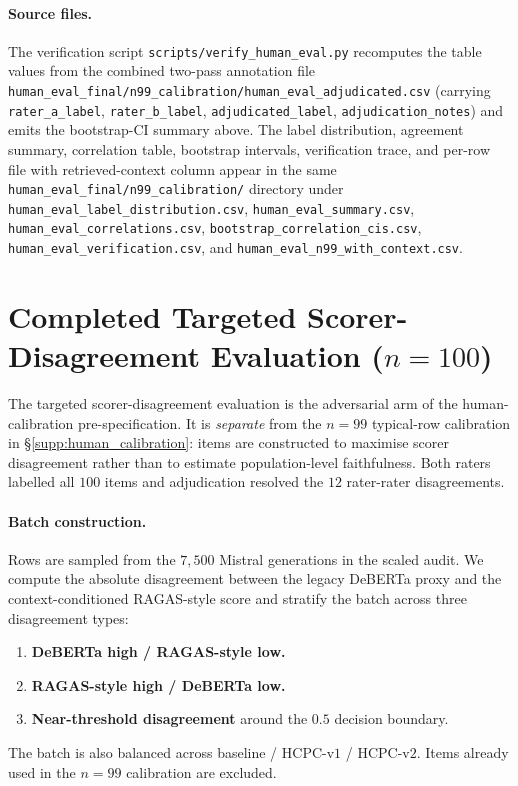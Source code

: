 \documentclass[11pt]{article}
\begin{document}
\paragraph{Source files.}
\begin{sloppypar}
The verification script \texttt{scripts/verify\_human\_eval.py}
recomputes the table values from the combined two-pass annotation
file \texttt{human\_eval\_final/n99\_calibration/human\_eval\_adjudicated.csv}
(carrying \texttt{rater\_a\_label}, \texttt{rater\_b\_label},
\texttt{adjudicated\_label}, \texttt{adjudication\_notes}) and emits
the bootstrap-CI summary above. The label distribution, agreement
summary, correlation table, bootstrap intervals, verification trace,
and per-row file with retrieved-context column appear in the same
\texttt{human\_eval\_final/n99\_calibration/} directory under
\texttt{human\_eval\_label\_distribution.csv},
\texttt{human\_eval\_summary.csv},
\texttt{human\_eval\_correlations.csv},
\texttt{bootstrap\_correlation\_cis.csv},
\texttt{human\_eval\_verification.csv}, and
\texttt{human\_eval\_n99\_with\_context.csv}.
\end{sloppypar}

\section{Completed Targeted Scorer-Disagreement Evaluation ($n=100$)}
\label{supp:human_disagreement}

The targeted scorer-disagreement evaluation is the adversarial arm of
the human-calibration pre-specification. It is \emph{separate} from the
$n=99$ typical-row calibration in \S\ref{supp:human_calibration}: items
are constructed to maximise scorer disagreement rather than to
estimate population-level faithfulness. Both raters labelled all $100$
items and adjudication resolved the $12$ rater-rater disagreements.

\paragraph{Batch construction.}
Rows are sampled from the $7{,}500$ Mistral generations in the scaled
audit. We compute the absolute disagreement between the legacy DeBERTa
proxy and the context-conditioned RAGAS-style score and stratify the
batch across three disagreement types:
\begin{enumerate}
    \item \textbf{DeBERTa high / RAGAS-style low.}
    \item \textbf{RAGAS-style high / DeBERTa low.}
    \item \textbf{Near-threshold disagreement} around the $0.5$
        decision boundary.
\end{enumerate}
The batch is also balanced across baseline / HCPC-v$1$ / HCPC-v$2$.
Items already used in the $n=99$ calibration are excluded.
\end{document}
